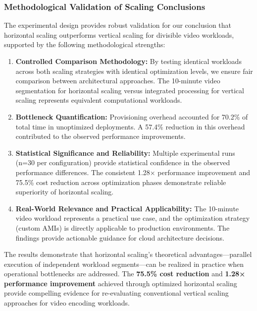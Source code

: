 \documentclass[conference]{IEEEtran}
\begin{document}
	\subsubsection{Methodological Validation of Scaling Conclusions}
	
	The experimental design provides robust validation for our conclusion that horizontal scaling outperforms vertical scaling for divisible video workloads, supported by the following methodological strengths:
	
	\begin{enumerate}
		\item \textbf{Controlled Comparison Methodology:} By testing identical workloads across both scaling strategies with identical optimization levels, we ensure fair comparison between architectural approaches. The 10-minute video segmentation for horizontal scaling versus integrated processing for vertical scaling represents equivalent computational workloads.
		
		\item \textbf{Bottleneck Quantification:} Provisioning overhead accounted for 70.2\% of total time in unoptimized deployments. A 57.4\% reduction in this overhead contributed to the observed performance improvements.
		
		\item \textbf{Statistical Significance and Reliability:} Multiple experimental runs (n=30 per configuration) provide statistical confidence in the observed performance differences. The consistent 1.28× performance improvement and 75.5\% cost reduction across optimization phases demonstrate reliable superiority of horizontal scaling.
		
		\item \textbf{Real-World Relevance and Practical Applicability:} The 10-minute video workload represents a practical use case, and the optimization strategy (custom AMIs) is directly applicable to production environments. The findings provide actionable guidance for cloud architecture decisions.
	\end{enumerate}
	
	The results demonstrate that horizontal scaling's theoretical advantages—parallel execution of independent workload segments—can be realized in practice when operational bottlenecks are addressed. The \textbf{75.5\% cost reduction} and \textbf{1.28× performance improvement} achieved through optimized horizontal scaling provide compelling evidence for re-evaluating conventional vertical scaling approaches for video encoding workloads.
	
\end{document}
